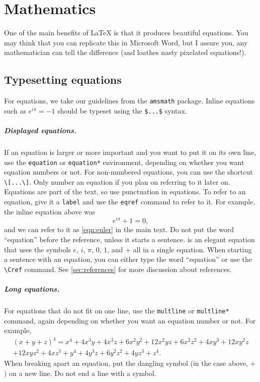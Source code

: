 \chapter{Mathematics}

One of the main benefits of LaTeX is that it produces beautiful equations. You may think that you can replicate this in Microsoft Word, but I assure you, any mathematician can tell the difference (and loathes nasty pixelated equations!).


\section{Typesetting equations}
For equations, we take our guidelines from the \verb|amsmath| package. 
Inline equations such as $e^{i\pi}=-1$ should be typeset using the \verb|$...$| syntax.

\paragraph{Displayed equations.}
If an equation is larger or more important and you want to put it on its own line, use the \verb|equation| or \verb|equation*| environment, depending on whether you want equation numbers or not. For non-numbered equations, you can use the shortcut \verb|\[...\]|. Only number an equation if you plan on referring to it later on. Equations are part of the text, so use punctuation in equations. To refer to an equation, give it a \verb|label| and use the \verb|eqref| command to refer to it. For example, the inline equation above was
\begin{equation}\label{eqn:euler}
  e^{i\pi} + 1 = 0,
\end{equation}
and we can refer to it as \eqref{eqn:euler} in the main text. Do not put the word ``equation'' before the reference, unless it starts a sentence.  is an elegant equation that uses the symbols $e$, $i$, $\pi$, $0$, $1$, and $+$ all in a single equation. When starting a sentence with an equation, you can either type the word ``equation'' or use the \verb|\Cref| command. See \cref{sec:references} for more discussion about references.

\paragraph{Long equations.} For equations that do not fit on one line, use the \verb|multline| or \verb|multline*| command, again depending on whether you want an equation number or not. For example,
\begin{multline}
	(x+y+z)^4 =
	x^4+4 x^3 y+4 x^3 z+6 x^2 y^2+12 x^2 y z+6 x^2 z^2+4 x y^3+12 x y^2 z\\
	+12 x y z^2+4 x z^3+y^4+4 y^3 z+6 y^2 z^2+4 y z^3+z^4.
\end{multline}
When breaking apart an equation, put the dangling symbol (in the case above, $+$) on a new line. Do not end a line with a symbol.

